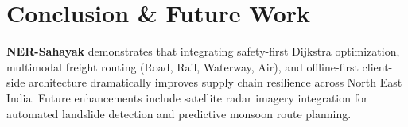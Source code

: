 \documentclass[11pt,a4paper]{article}
\begin{document}
\section{Conclusion \& Future Work}
\textbf{NER-Sahayak} demonstrates that integrating safety-first Dijkstra optimization, multimodal freight routing (Road, Rail, Waterway, Air), and offline-first client-side architecture dramatically improves supply chain resilience across North East India. Future enhancements include satellite radar imagery integration for automated landslide detection and predictive monsoon route planning.
\end{document}
